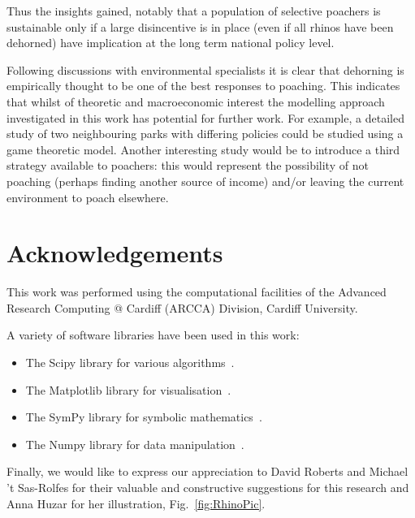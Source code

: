 \documentclass[10pt]{article}
\begin{document}
Thus the insights gained, notably that a population of selective poachers is
sustainable only if a large disincentive is in place (even if all rhinos have
been dehorned) have implication at the long term national policy level.

Following discussions with environmental specialists it is clear that dehorning
is empirically thought to be one of the best responses to poaching. This
indicates that whilst of theoretic and macroeconomic interest the modelling
approach investigated in this work has potential for further work. For example,
a detailed study of two neighbouring parks with differing policies could be
studied using a game theoretic model. Another interesting study would be to
introduce a third strategy available to poachers: this would represent the
possibility of not poaching (perhaps finding another source of income) and/or
leaving the current environment to poach elsewhere.

\section*{Acknowledgements}

This work was performed using the computational facilities of the Advanced
Research Computing @ Cardiff (ARCCA) Division, Cardiff University.

A variety of software libraries have been used in this work:

\begin{itemize}
    \item The Scipy library for various algorithms~\cite{scipy}.
    \item The Matplotlib library for visualisation~\cite{hunter2007matplotlib}.
    \item The SymPy library for symbolic mathematics~\cite{sympy}.
    \item The Numpy library for data manipulation~\cite{walt2011numpy}.
\end{itemize}

Finally, we would like to express our appreciation to David Roberts and Michael 't
Sas-Rolfes for their valuable and constructive suggestions for this research
and Anna Huzar for her illustration, Fig.~\ref{fig:RhinoPic}.



\end{document}
